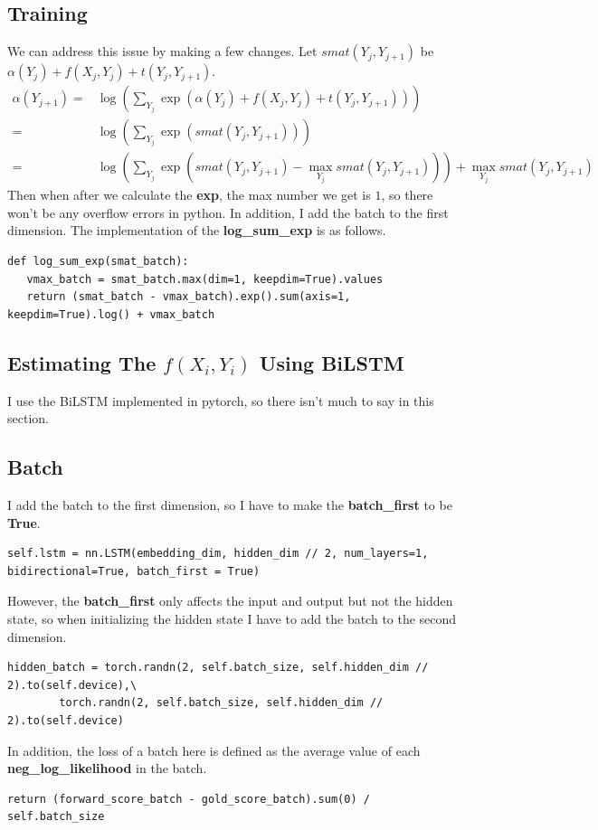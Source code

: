 \documentclass[a4paper, 11pt]{article}
\begin{document}
\subsection{Training}
We can address this issue by making a few changes. Let $smat(Y_j,Y_{j+1})$ be $\alpha(Y_j)+f(X_j,Y_j)+t(Y_j,Y_{j+1})$.
$$\begin{aligned}
    \alpha(Y_{j+1})=&\log(\sum_{Y_j}\exp(\alpha(Y_j)+f(X_j,Y_j)+t(Y_j,Y_{j+1})))\\
    =&\log(\sum_{Y_j}\exp(smat(Y_j,Y_{j+1})))\\
    =&\log(\sum_{Y_j}\exp(smat(Y_j,Y_{j+1})-\max_{Y_j}smat(Y_j,Y_{j+1})))+\max_{Y_j}smat(Y_j,Y_{j+1})
\end{aligned}$$
Then when after we calculate the \textbf{exp}, the max number we get is $1$, so there won't be any overflow errors in python.
In addition, I add the batch to the first dimension. The implementation of the \textbf{log\_sum\_exp} is as follows.
\begin{lstlisting}
def log_sum_exp(smat_batch):
   vmax_batch = smat_batch.max(dim=1, keepdim=True).values
   return (smat_batch - vmax_batch).exp().sum(axis=1, keepdim=True).log() + vmax_batch
\end{lstlisting}

\subsection{Estimating The $f(X_i,Y_i)$ Using BiLSTM}
I use the BiLSTM implemented in pytorch, so there isn't much to say in this section.

\subsection{Batch}
I add the batch to the first dimension, so I have to make the \textbf{batch\_first} to be \textbf{True}.
\begin{lstlisting}
self.lstm = nn.LSTM(embedding_dim, hidden_dim // 2, num_layers=1, bidirectional=True, batch_first = True)
\end{lstlisting}
However, the \textbf{batch\_first} only affects the input and output but not the hidden state, so when initializing the hidden state I have
to add the batch to the second dimension.
\begin{lstlisting}
hidden_batch = torch.randn(2, self.batch_size, self.hidden_dim // 2).to(self.device),\
        torch.randn(2, self.batch_size, self.hidden_dim // 2).to(self.device)
\end{lstlisting}
In addition, the loss of a batch here is defined as the average value of each \textbf{neg\_log\_likelihood} in the batch.
\begin{lstlisting}
return (forward_score_batch - gold_score_batch).sum(0) / self.batch_size
\end{lstlisting}
\end{document}
